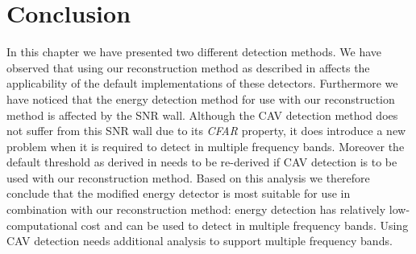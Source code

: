 \documentclass[a4paper, openany, oneside]{memoir}
\begin{document}
\section{Conclusion}
In this chapter we have presented two different detection methods. We have observed that using our reconstruction method as described in  affects the applicability of the default implementations of these detectors.  Furthermore we have noticed that the energy detection method for use with our reconstruction method is affected by the SNR wall. Although the CAV detection method does not suffer from this SNR wall due to its \emph{CFAR} property, it does introduce a new problem when it is required to detect in multiple frequency bands. Moreover the default threshold as derived in \cite{zheng2009spectrum} needs to be re-derived if CAV detection is to be used with our reconstruction method. Based on this analysis we therefore conclude that the modified energy detector is most suitable for use in combination with our reconstruction method: energy detection has relatively low-computational cost and can be used to detect in multiple frequency bands.  Using CAV detection needs additional analysis to support multiple frequency bands. 
\end{document}
